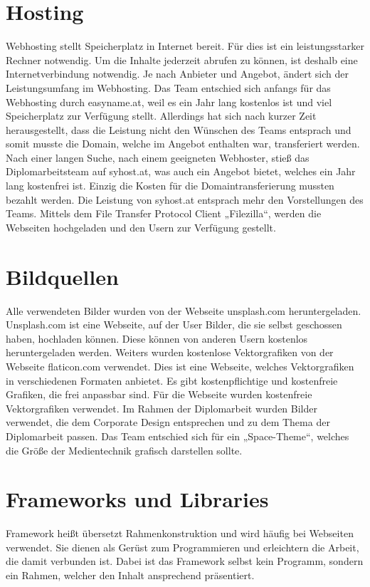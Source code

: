 \section{Hosting}
Webhosting stellt Speicherplatz in Internet bereit. Für dies ist ein leistungsstarker Rechner notwendig. Um die Inhalte jederzeit abrufen zu können, ist deshalb eine Internetverbindung notwendig. Je nach Anbieter und Angebot, ändert sich der Leistungsumfang im Webhosting. \cite{webhosting} Das Team entschied sich anfangs für das Webhosting durch easyname.at, weil es ein Jahr lang kostenlos ist und viel Speicherplatz zur Verfügung stellt. Allerdings hat sich nach kurzer Zeit herausgestellt, dass die Leistung nicht den Wünschen des Teams entsprach und somit musste die Domain, welche im Angebot enthalten war, transferiert werden. Nach einer langen Suche, nach einem geeigneten Webhoster, stieß das Diplomarbeitsteam auf syhost.at, was auch ein Angebot bietet, welches ein Jahr lang kostenfrei ist. Einzig die Kosten für die Domaintransferierung mussten bezahlt werden. Die Leistung von syhost.at entsprach mehr den Vorstellungen des Teams. Mittels dem File Transfer Protocol Client „Filezilla“, werden die Webseiten hochgeladen und den Usern zur Verfügung gestellt. 


\section{Bildquellen}
Alle verwendeten Bilder wurden von der Webseite unsplash.com heruntergeladen. Unsplash.com ist eine Webseite, auf der User Bilder, die sie selbst geschossen haben, hochladen können. Diese können von anderen Usern kostenlos heruntergeladen werden. Weiters wurden kostenlose Vektorgrafiken von der Webseite flaticon.com verwendet. Dies ist eine Webseite, welches Vektorgrafiken in verschiedenen Formaten anbietet. Es gibt kostenpflichtige und kostenfreie Grafiken, die frei anpassbar sind. Für die Webseite wurden kostenfreie Vektorgrafiken verwendet. Im Rahmen der Diplomarbeit wurden Bilder verwendet, die dem Corporate Design entsprechen und zu dem Thema der Diplomarbeit passen. Das Team entschied sich für ein „Space-Theme“, welches die Größe der Medientechnik grafisch darstellen sollte. 

\section{Frameworks und Libraries} 
Framework heißt übersetzt Rahmenkonstruktion und wird häufig bei Webseiten verwendet. Sie dienen als Gerüst zum Programmieren und erleichtern die Arbeit, die damit verbunden ist. Dabei ist das Framework selbst kein Programm, sondern ein Rahmen, welcher den Inhalt ansprechend präsentiert. \cite{framework}


